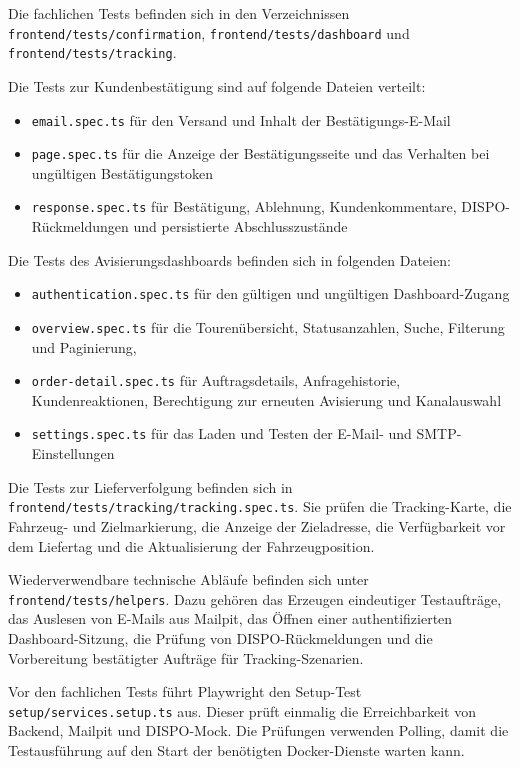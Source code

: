 Die fachlichen Tests befinden sich in den Verzeichnissen
\texttt{frontend/tests/confirmation},
\texttt{frontend/tests/dashboard} und
\texttt{frontend/tests/tracking}.

Die Tests zur Kundenbestätigung sind auf folgende Dateien
verteilt:

\begin{itemize}
    \item \texttt{email.spec.ts} für den Versand und Inhalt der
    Bestätigungs-E-Mail
    \item \texttt{page.spec.ts} für die Anzeige der Bestätigungsseite
    und das Verhalten bei ungültigen Bestätigungstoken
    \item \texttt{response.spec.ts} für Bestätigung, Ablehnung,
    Kundenkommentare, DISPO-Rückmeldungen und persistierte
    Abschlusszustände
\end{itemize}

Die Tests des Avisierungsdashboards befinden sich in folgenden
Dateien:

\begin{itemize}
    \item \texttt{authentication.spec.ts} für den gültigen und
    ungültigen Dashboard-Zugang
    \item \texttt{overview.spec.ts} für die Tourenübersicht,
    Statusanzahlen, Suche, Filterung und Paginierung,
    \item \texttt{order-detail.spec.ts} für Auftragsdetails,
    Anfragehistorie, Kundenreaktionen, Berechtigung zur erneuten
    Avisierung und Kanalauswahl
    \item \texttt{settings.spec.ts} für das Laden und Testen der
    E-Mail- und SMTP-Einstellungen
\end{itemize}

Die Tests zur Lieferverfolgung befinden sich in
\texttt{frontend/tests/tracking/tracking.spec.ts}. Sie prüfen
die Tracking-Karte, die Fahrzeug- und Zielmarkierung, die
Anzeige der Zieladresse, die Verfügbarkeit vor dem Liefertag
und die Aktualisierung der Fahrzeugposition.

Wiederverwendbare technische Abläufe befinden sich unter
\texttt{frontend/tests/helpers}. Dazu gehören das Erzeugen
eindeutiger Testaufträge, das Auslesen von E-Mails aus Mailpit,
das Öffnen einer authentifizierten Dashboard-Sitzung, die
Prüfung von DISPO-Rückmeldungen und die Vorbereitung bestätigter
Aufträge für Tracking-Szenarien.

Vor den fachlichen Tests führt Playwright den Setup-Test
\texttt{setup/services.setup.ts} aus. Dieser prüft einmalig die
Erreichbarkeit von Backend, Mailpit und DISPO-Mock. Die
Prüfungen verwenden Polling, damit die Testausführung auf den
Start der benötigten Docker-Dienste warten kann.

